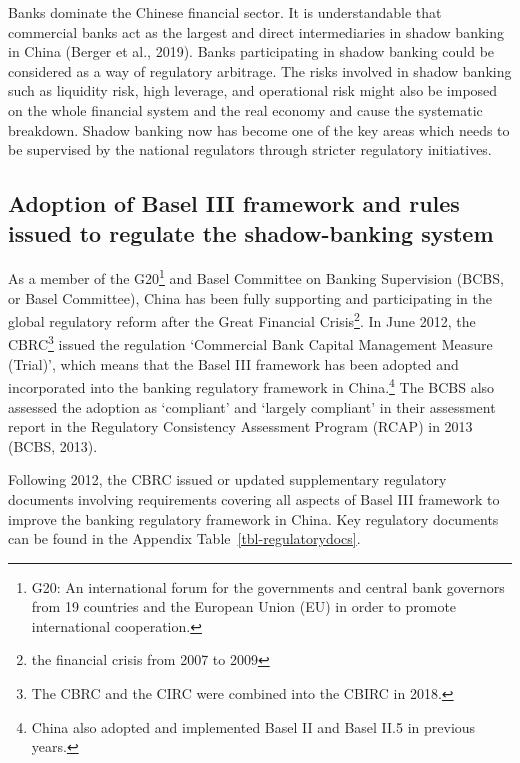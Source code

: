 \documentclass[
  12pt,
  a4paper,
]{scrreprt}
\begin{document}
Banks dominate the Chinese financial sector. It is understandable that
commercial banks act as the largest and direct intermediaries in shadow
banking in China (Berger et al., 2019). Banks participating in shadow
banking could be considered as a way of regulatory arbitrage. The risks
involved in shadow banking such as liquidity risk, high leverage, and
operational risk might also be imposed on the whole financial system and
the real economy and cause the systematic breakdown. Shadow banking now
has become one of the key areas which needs to be supervised by the
national regulators through stricter regulatory initiatives.

\subsection{Adoption of Basel III framework and rules issued to regulate
the shadow-banking
system}\label{adoption-of-basel-iii-framework-and-rules-issued-to-regulate-the-shadow-banking-system}

As a member of the G20\footnote{G20: An international forum for the
  governments and central bank governors from 19 countries and the
  European Union (EU) in order to promote international cooperation.}
and Basel Committee on Banking Supervision (BCBS, or Basel Committee),
China has been fully supporting and participating in the global
regulatory reform after the Great Financial Crisis\footnote{the
  financial crisis from 2007 to 2009}. In June 2012, the CBRC\footnote{The
  CBRC and the CIRC were combined into the CBIRC in 2018.} issued the
regulation `Commercial Bank Capital Management Measure (Trial)', which
means that the Basel III framework has been adopted and incorporated
into the banking regulatory framework in China.\footnote{China also
  adopted and implemented Basel II and Basel II.5 in previous years.}
The BCBS also assessed the adoption as `compliant' and `largely
compliant' in their assessment report in the Regulatory Consistency
Assessment Program (RCAP) in 2013 (BCBS, 2013).

Following 2012, the CBRC issued or updated supplementary regulatory
documents involving requirements covering all aspects of Basel III
framework to improve the banking regulatory framework in China. Key
regulatory documents can be found in the Appendix
Table~\ref{tbl-regulatorydocs}.
\end{document}
